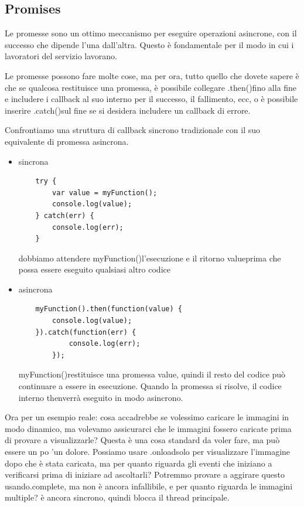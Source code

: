 \documentclass[italian]{article}
\begin{document}
\subsection{Promises}
Le promesse sono un ottimo meccanismo per eseguire operazioni asincrone, con il successo che dipende l'una dall'altra. Questo è fondamentale per il modo in cui i lavoratori del servizio lavorano. 

Le promesse possono fare molte cose, ma per ora, tutto quello che dovete sapere è che se qualcosa restituisce una promessa, è possibile collegare .then()fino alla fine e includere i callback al suo interno per il successo, il fallimento, ecc, o è possibile inserire .catch()sul fine se si desidera includere un callback di errore.

Confrontiamo una struttura di callback sincrono tradizionale con il suo equivalente di promessa asincrona.
\begin{itemize}
\item sincrona 
\begin{lstlisting}
	try {
		var value = myFunction();
		console.log(value);
	} catch(err) {
		console.log(err);
	}
\end{lstlisting}
dobbiamo attendere myFunction()l'esecuzione e il ritorno valueprima che possa essere eseguito qualsiasi altro codice
\item  asincrona
\begin{lstlisting}
	myFunction().then(function(value) {
		console.log(value);
	}).catch(function(err) {
			console.log(err);
		});
\end{lstlisting}
myFunction()restituisce una promessa value, quindi il resto del codice può continuare a essere in esecuzione. Quando la promessa si risolve, il codice interno thenverrà eseguito in modo asincrono. 
\end{itemize}
Ora per un esempio reale: cosa accadrebbe se volessimo caricare le immagini in modo dinamico, ma volevamo assicurarci che le immagini fossero caricate prima di provare a visualizzarle? Questa è una cosa standard da voler fare, ma può essere un po 'un dolore. Possiamo usare .onloadsolo per visualizzare l'immagine dopo che è stata caricata, ma per quanto riguarda gli eventi che iniziano a verificarsi prima di iniziare ad ascoltarli? Potremmo provare a aggirare questo usando.complete, ma non è ancora infallibile, e per quanto riguarda le immagini multiple? è ancora sincrono, quindi blocca il thread principale. 
\end{document}
